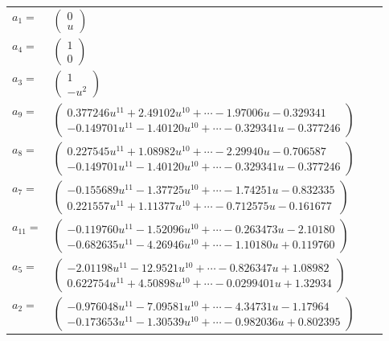\documentclass[1p]{elsarticle_modified}
\theoremstyle{definition}
\begin{document}
\begin{tabular}{m{7pt} m{180pt} m{7pt} m{180pt} }
\flushright $a_{1}=$&$\begin{pmatrix}0\\u\end{pmatrix}$ \\
\flushright $a_{4}=$&$\begin{pmatrix}1\\0\end{pmatrix}$ \\
\flushright $a_{3}=$&$\begin{pmatrix}1\\- u^2\end{pmatrix}$ \\
\flushright $a_{9}=$&$\begin{pmatrix}0.377246 u^{11}+2.49102 u^{10}+\cdots-1.97006 u-0.329341\\-0.149701 u^{11}-1.40120 u^{10}+\cdots-0.329341 u-0.377246\end{pmatrix}$ \\
\flushright $a_{8}=$&$\begin{pmatrix}0.227545 u^{11}+1.08982 u^{10}+\cdots-2.29940 u-0.706587\\-0.149701 u^{11}-1.40120 u^{10}+\cdots-0.329341 u-0.377246\end{pmatrix}$ \\
\flushright $a_{7}=$&$\begin{pmatrix}-0.155689 u^{11}-1.37725 u^{10}+\cdots-1.74251 u-0.832335\\0.221557 u^{11}+1.11377 u^{10}+\cdots-0.712575 u-0.161677\end{pmatrix}$ \\
\flushright $a_{11}=$&$\begin{pmatrix}-0.119760 u^{11}-1.52096 u^{10}+\cdots-0.263473 u-2.10180\\-0.682635 u^{11}-4.26946 u^{10}+\cdots-1.10180 u+0.119760\end{pmatrix}$ \\
\flushright $a_{5}=$&$\begin{pmatrix}-2.01198 u^{11}-12.9521 u^{10}+\cdots-0.826347 u+1.08982\\0.622754 u^{11}+4.50898 u^{10}+\cdots-0.0299401 u+1.32934\end{pmatrix}$ \\
\flushright $a_{2}=$&$\begin{pmatrix}-0.976048 u^{11}-7.09581 u^{10}+\cdots-4.34731 u-1.17964\\-0.173653 u^{11}-1.30539 u^{10}+\cdots-0.982036 u+0.802395\end{pmatrix}$ \\

\end{tabular}
\end{document}
